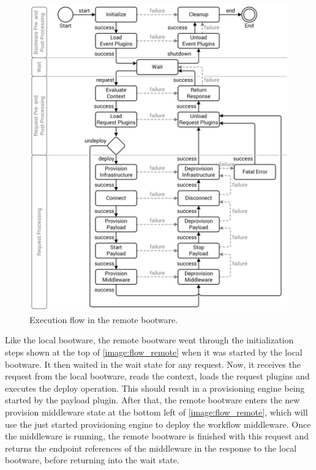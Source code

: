\begin{figure}[!htbp]
	\centering
	\includegraphics[resolution=600]{design/assets/flow_remote}
	\caption{Execution flow in the remote bootware.}
	\label{image:flow_remote}
\end{figure}

Like the local bootware, the remote bootware went through the initialization steps shown at the top of \autoref{image:flow_remote} when it was started by the local bootware.
It then waited in the wait state for any request.
Now, it receives the request from the local bootware, reads the context, loads the request plugins and executes the deploy operation.
This should result in a provisioning engine being started by the payload plugin.
After that, the remote bootware enters the new provision middleware state at the bottom left of \autoref{image:flow_remote}, which will use the just started provisioning engine to deploy the workflow middleware.
Once the middleware is running, the remote bootware is finished with this request and returns the endpoint references of the middleware in the response to the local bootware, before returning into the wait state.

